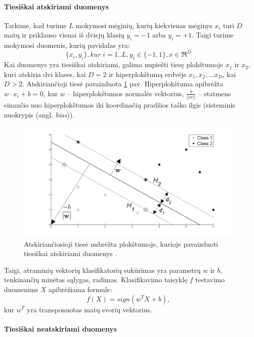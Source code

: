 \paragraph{Tiesiškai atskiriami duomenys}

Tarkime, kad turime $L$ mokymosi mėginių, kurių kiekvienas mėginys $x_i$ turi $D$ matų ir priklauso vienai iš dviejų klasių $y_i=-1$ arba $y_i=+1$. Taigi turime mokymosi duomenis, kurių pavidalas yra:
\begin{equation}
 \{x_i, y_i\}, kur\; i=1..L, y_i \in \{-1,1\}, x \in \Re^D
\end{equation}
Kai duomenys yra tiesiškai atskiriami, galima nupiešti tiesę plokštumoje $x_1$ ir $x_2$, kuri atskiria dvi klases, kai $D=2$ ir hiperplokštumą erdvėje $x_1, x_2,...x_D$, kai $D > 2$. Atskiriančioji tiesė pavaizduota \ref{fig:support_vector_machines} pav. Hiperplokštuma apibrėžta $w\cdot x_i + b = 0$, kur $w$ -- hiperplokštumos normalės vektorius, $\frac{b}{||w||}$ -- statmens einančio nuo hiperplokštumos iki koordinačių pradžios taško ilgis (sisteminis nuokrypis (angl. \textit{bias})).
\begin{figure}
 \centering
 \includegraphics[width=.7\textwidth]{images/support_vector_machines.jpg}
 \caption{Atskiriančiosioji tiesė nubrėžta plokštumoje, kurioje pavaizduoti tiesiškai atskiriami duomenys \cite{fletcher2009support}.}
 \label{fig:support_vector_machines}
\end{figure}

 Taigi, atraminių vektorių klasifikatorių sukūrimas yra parametrų $w$ ir $b$, tenkinančių minėtas sąlygas, radimas. Klasifikavimo taisyklę $f$ testavimo duomenims $X$ apibrėžiama formule:
\begin{equation}
 \label{svm_separable}
 f(X) = sign(w^T X + b),
\end{equation}
kur $w^T$ yra transponuotas matų svorių vektorius.

\paragraph{Tiesiškai neatskiriami duomenys}

